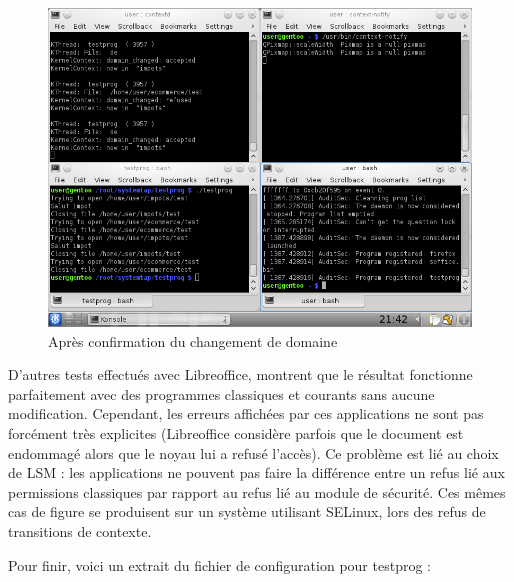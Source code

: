 \documentclass[pdftex,a4paper,titlepage,11pt]{article}
\begin{document}
\begin{figure}%
	\centering
	\includegraphics[scale=0.5]{attachements/capture_fin.png}
	\caption{Après confirmation du changement de domaine}
	\label{FIN}
\end{figure}

D'autres tests effectués avec Libreoffice, montrent que le résultat fonctionne parfaitement avec des programmes classiques et courants sans aucune modification. Cependant, les erreurs affichées par ces applications ne sont pas forcément très explicites (Libreoffice considère parfois que le document est endommagé alors que le noyau lui a refusé l'accès). Ce problème est lié au choix de LSM : les applications ne pouvent pas faire la différence entre un refus lié aux permissions classiques par rapport au refus lié au module de sécurité. Ces mêmes cas de figure se produisent sur un système utilisant SELinux, lors des refus de transitions de contexte.

Pour finir, voici un extrait du fichier de configuration pour testprog :
\end{document}

